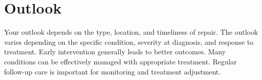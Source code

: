 \section{Outlook}
Your outlook depends on the type, location, and timeliness of repair. The outlook varies depending on the specific condition, severity at diagnosis, and response to treatment. Early intervention generally leads to better outcomes. Many conditions can be effectively managed with appropriate treatment. Regular follow-up care is important for monitoring and treatment adjustment.
